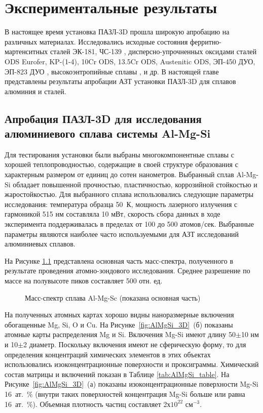\chapter{Экспериментальные результаты}\label{ch:ch4}

В настоящее время установка ПАЗЛ-3D прошла широкую апробацию на различных материалах. Исследовались исходные состояния ферритно-мартенситных сталей ЭК-181, ЧС-139 \cite{Rogozhkin19}, дисперсно-упрочненных оксидами сталей ODS Eurofer, KP-(1-4), 10Cr ODS, 13.5Cr ODS, Austenitic ODS, ЭП-450 ДУО, ЭП-823 ДУО \cite{Rogozhkin24,Rogozhkin22},  высокоэнтропийные сплавы \cite{Rogozhkin20}, и др. В настоящей главе представлены результаты апробации АЗТ установки ПАЗЛ-3D для сплавов алюминия и сталей.


\section{Апробация ПАЗЛ-3D для исследования алюминиевого сплава системы Al-Mg-Si}\label{sec:ch4/sect1}

Для тестирования установки были выбраны многокомпонентные сплавы с хорошей теплопроводностью, содержащие в своей структуре образования с характерным размером от единиц до сотен нанометров. Выбранный сплав Al-Mg-Si обладает повышенной прочностью, пластичностью, коррозийной стойкостью и жаростойкостью. Для выбранного сплава использовались следующие параметры исследования: температура образца 50~К, мощность лазерного излучения с гармоникой 515 нм составляла 10 мВт, скорость сбора данных в ходе эксперимента поддерживалась в пределах от 100 до 500 атомов/сек. Выбранные параметры являются наиболее часто используемыми для АЗТ исследований алюминиевых сплавов.

На Рисунке \cref{fig:AlMgSi_mass} представлена основная часть масс-спектра, полученного в результате проведения атомно-зондового исследования. Среднее разрешение по массе на полувысоте пиков составляет 500 отн. ед.

\begin{figure}[htb]
	\caption{Масс-спектр сплава Al-Mg-Sc (показана основная часть)\cite{scbibAlumYAFI}}
	\label{fig:AlMgSi_mass}
\end{figure} 
\FloatBarrier

На полученных атомных картах хорошо видны наноразмерные включения обогащенные Mg, Si, O и Cu. На Рисунке~\cref{fig:AlMgSi_3D}~(б) показаны атомные карты распределения Mg и Si. Включения Mg-Si имеют длину 50$\pm$10 нм и 10$\pm$2 диаметр. Поскольку включения имеют не сферическую форму, то для определения концентраций химических элементов в этих объектах использовались изоконцентрационные поверхности и проксиграммы. Химический состав матрицы и включений показан в Таблице \cref{tab:AlMgSi_table}. На Рисунке~\cref{fig:AlMgSi_3D}~(а) показаны изоконцентрационные поверхности Mg-Si 16~ат.~$\%$ (внутри таких поверхностей концентрация Mg-Si больше или равна 16~ат.~$\%$). Объемная плотность частиц составляет 2х$10^{22}$ см$^{-3}$.

